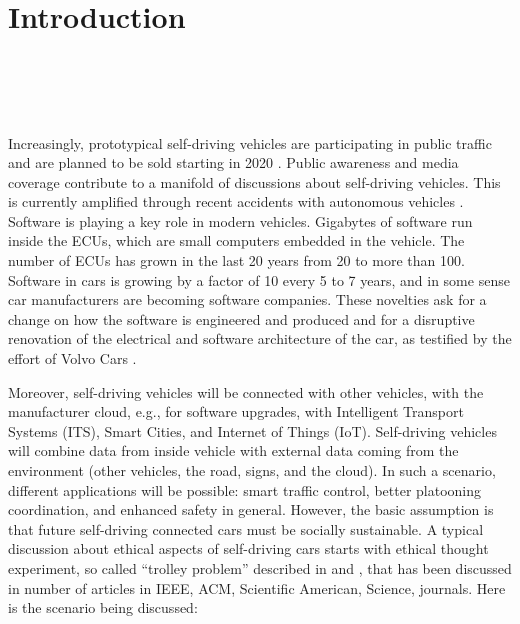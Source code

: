 \section{Introduction}

\\
\\
\\
\\

Increasingly, prototypical self-driving vehicles are participating in public traffic \cite{Persson2014} and are planned to be sold starting in 2020 \cite{Toyota2015,Stoll_WSJ_2016}. Public awareness and media coverage contribute to a manifold of discussions about self-driving vehicles. This is currently amplified through recent accidents with autonomous vehicles \cite{Tesla2016_tragicloss,Dolgov2016}. Software is playing a key role in modern vehicles. Gigabytes of software run inside the \acp{ECU}, which are small computers embedded in the vehicle. The number of \acp{ECU} has grown in the last 20 years from 20 to more than 100. Software in cars is growing by a factor of 10 every 5 to 7 years, and in some sense car manufacturers are becoming software companies. These novelties ask for a change on how the software is engineered and produced and for a disruptive renovation of the electrical and software architecture of the car, as testified by the effort of Volvo Cars \cite{PELLICCIONE201783}.

Moreover, self-driving vehicles will be connected with other vehicles, with the manufacturer cloud, e.g., for software upgrades, with Intelligent Transport Systems (ITS), Smart Cities, and Internet of Things (IoT). Self-driving vehicles will combine data from inside vehicle with external data coming from the environment (other vehicles, the road, signs, and the cloud). In such a scenario, different applications will be possible: smart traffic control, better platooning coordination, and enhanced safety in general.
However, the basic assumption is that future self-driving connected cars must be socially sustainable.
A typical discussion about ethical aspects of self-driving cars starts with ethical thought experiment, so called \enquote{trolley problem} described in \cite{Foot1967} and \cite{Wintersberger2017}, that has been discussed in number of articles in IEEE, ACM, Scientific American, Science, \ugh{[31-38]} journals. Here is the scenario being discussed:

